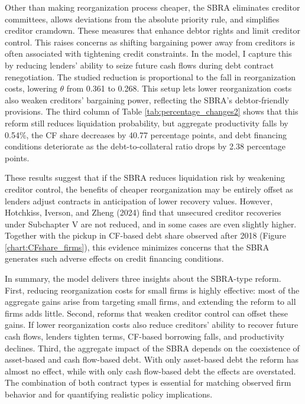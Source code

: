 \documentclass[12pt]{article}
\begin{document}
Other than making reorganization process cheaper, the SBRA eliminates creditor committees, allows deviations from the absolute priority rule, and simplifies creditor cramdown. These measures that enhance debtor rights and limit creditor control. This raises concerns as shifting bargaining power away from creditors is often associated with tightening credit constraints. In the model, I capture this by reducing lenders' ability to seize future cash flows during debt contract renegotiation. The studied reduction is proportional to the fall in reorganization costs, lowering $\theta$ from 0.361 to 0.268. This setup lets lower reorganization costs also weaken creditors' bargaining power, reflecting the SBRA's debtor-friendly provisions. The third column of Table \ref{tab:percentage_changes2} shows that this reform still reduces liquidation probability, but aggregate productivity falls by 0.54\%, the CF share decreases by 40.77 percentage points, and debt financing conditions deteriorate as the debt-to-collateral ratio drops by 2.38 percentage points. 

These results suggest that if the SBRA reduces liquidation risk by weakening creditor control, the benefits of cheaper reorganization may be entirely offset as lenders adjust contracts in anticipation of lower recovery values. However, Hotchkiss, Iverson, and Zheng (2024) find that unsecured creditor recoveries under Subchapter V are not reduced, and in some cases are even slightly higher. Together with the pickup in CF-based debt share observed after 2018 (Figure \ref{chart:CFshare_firms}), this evidence minimizes concerns that the SBRA generates such adverse effects on credit financing conditions.

In summary, the model delivers three insights about the SBRA-type reform. First, reducing reorganization costs for small firms is highly effective: most of the aggregate gains arise from targeting small firms, and extending the reform to all firms adds little. Second, reforms that weaken creditor control can offset these gains. If lower reorganization costs also reduce creditors’ ability to recover future cash flows, lenders tighten terms, CF-based borrowing falls, and productivity declines. Third, the aggregate impact of the SBRA depends on the coexistence of asset-based and cash flow-based debt. With only asset-based debt the reform has almost no effect, while with only cash flow-based debt the effects are overstated. The combination of both contract types is essential for matching observed firm behavior and for quantifying realistic policy implications.
\end{document}
